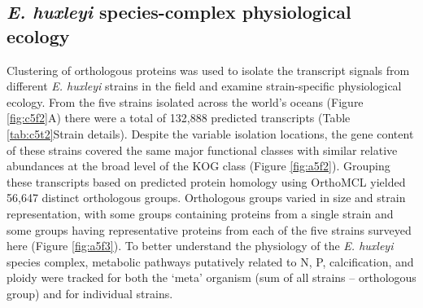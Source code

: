 \begin{figure}[h!]
\end{figure}



\subsection{\textit{E. huxleyi} species-complex physiological ecology}

Clustering of orthologous proteins was used to isolate the transcript signals from different \textit{E. huxleyi} strains in the field and examine strain-specific physiological ecology. From the five strains isolated across the world's oceans (Figure \ref{fig:c5f2}A) there were a total of 132,888 predicted transcripts (Table \ref{tab:c5t2}Strain details). Despite the variable isolation locations, the gene content of these strains covered the same major functional classes with similar relative abundances at the broad level of the KOG class (Figure \ref{fig:a5f2}). Grouping these transcripts based on predicted protein homology using OrthoMCL \citep{Li2003} yielded 56,647 distinct orthologous groups. Orthologous groups varied in size and strain representation, with some groups containing proteins from a single strain and some groups having representative proteins from each of the five strains surveyed here (Figure \ref{fig:a5f3}). To better understand the physiology of the \textit{E. huxleyi} species complex, metabolic pathways putatively related to N, P, calcification, and ploidy were tracked for both the `meta' organism (sum of all strains -- orthologous group) and for individual strains. \par

